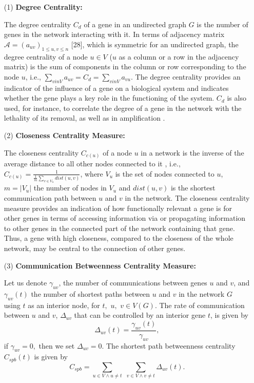 \documentclass[10pt]{article}
\begin{document}
\begin{itemize}
\item [(1)] \textbf{Degree Centrality:}

The degree centrality $C_{d}$ of a gene in an undirected graph $G$ is the number of genes in the network
interacting with it. In terms of adjacency matrix $\mathcal{A} = \left(a_{uv}\right)_{1\leq u,v \leq n}$ [28], which is symmetric for an undirected graph, the degree centrality of a node $u \in V$ ($u$ as a column or a row in the adjacency matrix) is the sum of components in the column or row corresponding to the node $u$, i.e., $\sum_{v in V} a_{uv} = C_d = \sum_{v in V} a_{vu}$. The degree centrality provides an indicator of the influence of a gene on a biological system and indicates whether the gene plays a key role in the functioning of the system. $C_{d}$ is also used, for instance, to correlate the degree of a gene in the network with the lethality of its removal, as well as in amplification \cite{lith}.

\item [(2)] \textbf{Closeness Centrality Measure:} 

The closeness centrality $C_{c(u)}$ of a node $u$ in a network is the inverse of the average distance to all other nodes connected to it \cite{add1}, i.e., $C_{c(u)} = \frac{1}{\frac{1}{m} \sum_{v\in V_u}dist(u,v)}$, where $V_{u}$ is the set of nodes connected to $u$, $m =  \vert V_{u} \vert$ the number of nodes in $V_u$ and $dist(u, v)$ is the shortest communication path between $u$ and $v$ in the network. The closeness centrality measure provides an indication of how functionally relevant a gene is for other genes in terms of accessing information via or propagating information to other genes in the connected part of the network containing that gene. Thus, a gene with high closeness, compared to the closeness of the whole network, may be central to the connection of other genes.

\item[(3)] \textbf{Communication Betweenness Centrality Measure:} 

Let us denote $\gamma_{uv}$, the number of communications between genes $u$ and $v$, and $\gamma_{uv}\left(t\right)$ the number of shortest paths between $u$ and $v$ in the network $G$ using $t$ as an interior node, for $t,$ $u,$ $v\in V\left(G\right)$. The rate of communication between $u$ and $v$, $\Delta_{uv}$ that can be controlled by an interior gene $t$, is given by 
\begin{equation}
\Delta_{uv} (t)=\frac{\gamma_{uv}\left(t\right)}{\gamma_{uv}}, \nonumber
\end{equation}
if $\gamma_{uv}=0,$ then we set $\Delta_{uv}=0$. The shortest path betweenness centrality $C_{spb}\left(t\right)$ is given by 
\begin{equation}
C_{spb}=\sum_{u\in V\wedge u\neq t}\,\,\sum_{v\in V\wedge v\neq t}\Delta_{uv}\left(t\right).\nonumber
\end{equation}


\end{itemize}
\end{document}
